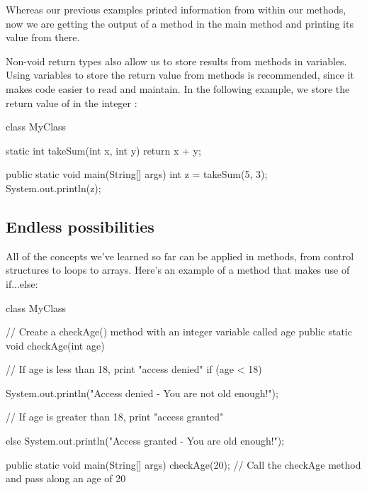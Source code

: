 Whereas our previous examples printed information from within our methods, now we are getting the output of a method in the main method and printing its value from there. 

Non-void return types also allow us to store results from methods in variables. Using variables to store the return value from methods is recommended, since it makes code easier to read and maintain. In the following example, we store the return value of  in the integer :

\begin{code}
class MyClass {
  static int takeSum(int x, int y) {
    return x + y;
  }

  public static void main(String[] args) {
    int z = takeSum(5, 3);
    System.out.println(z);
  }
}
\end{code}

\subsection{Endless possibilities} 

All of the concepts we've learned so far can be applied in methods, from control structures to loops to arrays. Here's an example of a method that makes use of if...else: 

\begin{code}
class MyClass {

  // Create a checkAge() method with an integer variable called age
  public static void checkAge(int age) {

    // If age is less than 18, print "access denied"
    if (age < 18) {
      System.out.println("Access denied - You are not old enough!");

    // If age is greater than 18, print "access granted"
    } else {
      System.out.println("Access granted - You are old enough!");
    }

  }

  public static void main(String[] args) {
    checkAge(20); // Call the checkAge method and pass along an age of 20
  }
}
\end{code}

